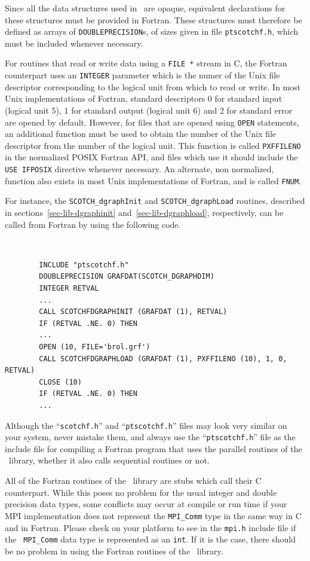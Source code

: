 Since all the data structures used in \libscotch\ are
opaque, equivalent declarations for these structures must
be provided in Fortran. These structures must therefore
be defined as arrays of {\tt DOUBLEPRECISION}s, of sizes
given in file {\tt ptscotchf.h}, which must be included whenever
necessary.

For routines that read or write data using a {\tt FILE~*} stream
in C, the Fortran counterpart uses an {\tt INTEGER} parameter which
is the numer of the Unix file descriptor corresponding to the logical
unit from which to read or write. In most Unix implementations of
Fortran, standard descriptors 0 for standard input (logical unit 5),
1 for standard output (logical unit 6) and 2 for standard error are
opened by default. However, for files that are opened using
{\tt OPEN} statements, an additional function must be used to obtain
the number of the Unix file descriptor from the number of the logical
unit. This function is called \texttt{PXFFILENO} in the normalized
POSIX Fortran API, and files which use it should include the
\texttt{USE IFPOSIX} directive whenever necessary. An alternate, non
normalized, function also exists in most Unix implementations of
Fortran, and is called {\tt FNUM}.

For instance, the {\tt SCOTCH\_\lbt dgraph\lbt Init} and
{\tt SCOTCH\_\lbt dgraph\lbt Load} routines, described in
sections~\ref{sec-lib-dgraphinit} and~\ref{sec-lib-dgraphload},
respectively, can be called from Fortran by using the following code.
{\tt
\begin{verbatim}
        INCLUDE "ptscotchf.h"
        DOUBLEPRECISION GRAFDAT(SCOTCH_DGRAPHDIM)
        INTEGER RETVAL
        ...
        CALL SCOTCHFDGRAPHINIT (GRAFDAT (1), RETVAL)
        IF (RETVAL .NE. 0) THEN
        ...
        OPEN (10, FILE='brol.grf')
        CALL SCOTCHFDGRAPHLOAD (GRAFDAT (1), PXFFILENO (10), 1, 0, RETVAL)
        CLOSE (10)
        IF (RETVAL .NE. 0) THEN
        ...
\end{verbatim}
}

Although the ``{\tt scotchf.h}'' and ``{\tt ptscotchf.h}'' files may
look very similar on your system, never mistake them, and always use
the ``{\tt ptscotchf.h}'' file as the include file for compiling a
Fortran program that uses the parallel routines of the
\libscotch\ library, whether it also calls sequential routines or not.

All of the Fortran routines of the \libscotch\ library are stubs which
call their C counterpart. While this poses no problem for the usual
integer and double precision data types, some conflicts may occur at
compile or run time if your MPI implementation does not represent the
{\tt MPI\_Comm} type in the same way in C and in Fortran. Please check
on your platform to see in the {\tt mpi.h} include file if the {\tt
MPI\_Comm} data type is represented as an {\tt int}. If it is the
case, there should be no problem in using the Fortran routines of
the \ptscotch\ library.

